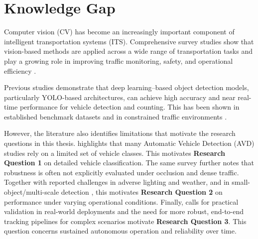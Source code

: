 
\section{Knowledge Gap}
Computer vision (CV) has become an increasingly important component of intelligent transportation systems (ITS). Comprehensive survey studies show that vision-based methods are applied across a wide range of transportation tasks and play a growing role in improving traffic monitoring, safety, and operational efficiency \citep{CVSurvey}.

Previous studies demonstrate that deep learning–based object detection models, particularly YOLO-based architectures, can achieve high accuracy and near real-time performance for vehicle detection and counting. This has been shown in established benchmark datasets and in constrained traffic environments \citep{Everingham10,HuggingFacePascalVOC, Song2019VisionBasedVehicle, smartcities6050134, YOLO-PEL}.

However, the literature also identifies limitations that motivate the research questions in this thesis. \citet{Maity2022LastDecadeVehicleDetection} highlights that many Automatic Vehicle Detection (AVD) studies rely on a limited set of vehicle classes. This motivates \textbf{Research Question 1} on detailed vehicle classification. The same survey further notes that robustness is often not explicitly evaluated under occlusion and dense traffic. Together with reported challenges in adverse lighting and weather, and in small-object/multi-scale detection \citep{DeepLearningTrafficScene2025,YOLO-PEL}, this motivates \textbf{Research Question 2} on performance under varying operational conditions. Finally, calls for practical validation in real-world deployments \citep{YOLO-PEL} and the need for more robust, end-to-end tracking pipelines for complex scenarios \citep{Hassan2024} motivate \textbf{Research Question 3}. This question concerns sustained autonomous operation and reliability over time.


